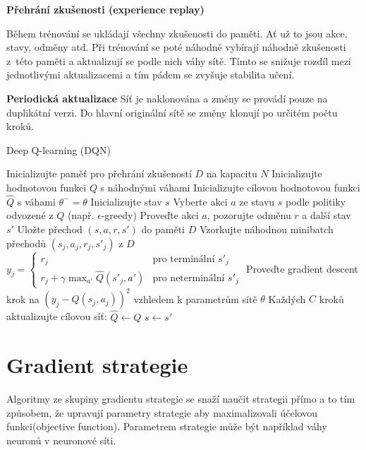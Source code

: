 \begin{myitemize}
  \item \textbf{Přehrání zkušenosti (experience replay)}
  
  Během trénování se ukládají všechny zkušenosti do paměti.
  Ať už to jsou akce, stavy, odměny atd.
  Při trénování se poté náhodně vybírají náhodně zkušenosti z~této paměti a aktualizují se podle nich váhy sítě.
  Tímto se snižuje rozdíl mezi jednotlivými aktualizacemi a tím pádem se zvyšuje stabilita učení.
  

  \item \textbf{Periodická aktualizace}
  Síť je naklonována a změny se provádí pouze na duplikátní verzi.
  Do hlavní originální sítě se změny klonují po určitém počtu kroků.

\end{myitemize}

\begin{algorithm}
  \caption{Deep Q-learning (DQN)}
  \begin{algorithmic}[1]
  \State Inicializujte paměť pro přehrání zkušeností $D$ na kapacitu $N$
  \State Inicializujte hodnotovou funkci $Q$ s náhodnými váhami
  \State Inicializujte cílovou hodnotovou funkci $\hat{Q}$ s váhami $\theta^- = \theta$
      \State Inicializujte stav $s$
          \State Vyberte akci $a$ ze stavu $s$ podle politiky odvozené z $Q$ (např. $\epsilon$-greedy)
          \State Proveďte akci $a$, pozorujte odměnu $r$ a další stav $s'$
          \State Uložte přechod $(s, a, r, s')$ do paměti $D$
          \State Vzorkujte náhodnou minibatch přechodů $(s_j, a_j, r_j, s'_j)$ z $D$
              \State $y_j = 
              \begin{cases} 
              r_j & \text{pro terminální } s'_j \\
              r_j + \gamma \max_{a'} \hat{Q}(s'_j, a') & \text{pro neterminální } s'_j
              \end{cases}$
              \State Proveďte gradient descent krok na $(y_j - Q(s_j, a_j))^2$ vzhledem k parametrům sítě $\theta$
          \EndFor
          \State Každých $C$ kroků aktualizujte cílovou síť: $\hat{Q} \leftarrow Q$
          \State $s \leftarrow s'$
      \EndFor
  \EndFor
  \end{algorithmic}
  \end{algorithm}
\section{Gradient strategie}\label{subsec:gradient-strategie}
Algoritmy ze skupiny gradientu strategie se snaží naučit strategii přímo a to tím způsobem, že upravují parametry strategie aby maximalizovali účelovou funkci(objective function).
Parametrem strategie může být například váhy neuronů v neuronové síti.


